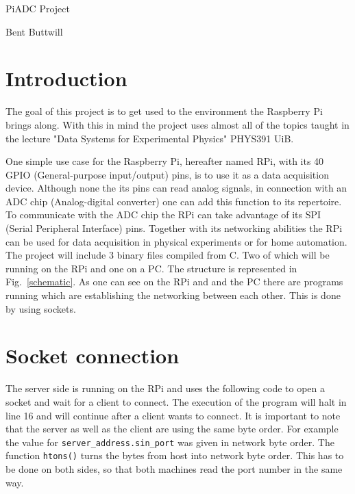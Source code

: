 \documentclass[12pt,paper=a4,twoside]{scrartcl}
\numberwithin{equation}{section}
\begin{document}
\newcommand{\loadVOne}[1]{\DTLgetvalueforkey{\dataValueOne}{thevalue}{mydata}{thekey}{#1}}
\newcommand{\loadVTwo}[1]{\DTLgetvalueforkey{\dataValueTwo}{thevalue}{mydata}{thekey}{#1}}


\vspace*{1cm}
\Large
\begin{center}
PiADC Project
\end{center}
\vspace{3mm}
\normalsize
\begin{center}
Bent Buttwill
\end{center}
\vspace{2cm}
\section{Introduction}
The goal of this project is to get used to the environment the Raspberry Pi brings along. With this in mind the project uses almost all of the topics taught in the lecture "Data Systems for Experimental Physics" PHYS391 UiB. 

One simple use case for the Raspberry Pi, hereafter named RPi, with its 40 GPIO (General-purpose input/output) pins, is to use it as a data acquisition device.
 Although none the its pins can read analog signals, in connection with an ADC chip (Analog-digital converter) one can add this function to its repertoire. 
To communicate with the ADC chip the RPi can take advantage of its SPI (Serial Peripheral Interface) pins. Together with its networking abilities the RPi can be used for data acquisition in physical experiments or for home automation.
\vspace{5mm}\\
The project will include 3 binary files compiled from C. Two of which will be running on the RPi and one on a PC. The structure is represented in Fig.~\ref{schematic}. As one can see on the RPi and and the PC there are programs running which are establishing the networking between each other. This is done by using sockets.
\vspace{10mm}\\

\section{Socket connection}
The server side is running on the RPi and uses the following code to open a socket and wait for a client to connect. The execution of the program will halt in line 16 and will continue after a client wants to connect. It is important to note that the server as well as the client are using the same byte order. For example the value for \verb+server_address.sin_port+ was given in network byte order. The function \verb+htons()+ turns the bytes from host into network byte order. This has to be done on both sides, so that both machines read the port number in the same way.
\end{document}

